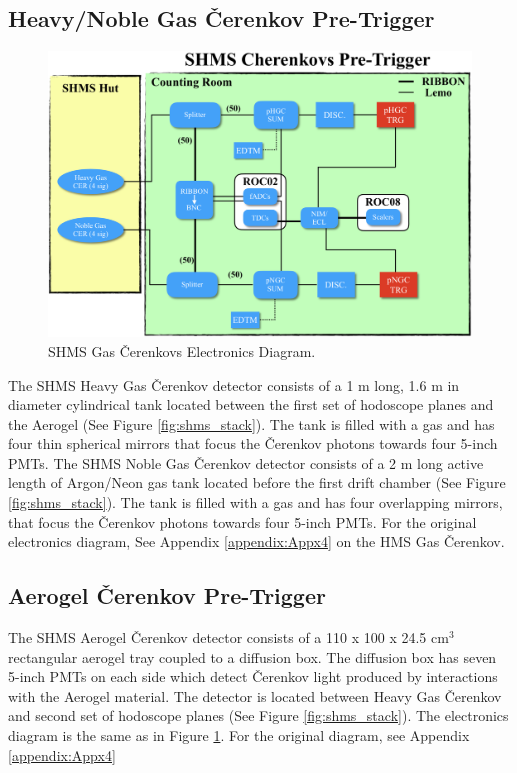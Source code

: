 \documentclass[11pt]{article}
\begin{document}
\subsection{Heavy/Noble Gas \v{C}erenkov Pre-Trigger}
\begin{figure}[h!]
  \centering
  \includegraphics[scale=0.5]{pCER_diagram.png}
  \caption{SHMS Gas \v{C}erenkovs Electronics Diagram.}
  \label{fig:pCER_diagram}
\end{figure}
\noindent The SHMS Heavy Gas \v{C}erenkov detector consists of a 1 m long, 1.6 m in diameter cylindrical tank located between the first set of hodoscope planes and the Aerogel (See Figure \ref{fig:shms_stack}).
The tank is filled with a gas and has four thin spherical mirrors that focus the \v{C}erenkov photons towards four 5-inch PMTs\cite{shms_hgc_talk}. 
\newline
\indent The SHMS Noble Gas \v{C}erenkov detector consists of a 2 m long active length of Argon/Neon gas tank located before the first drift chamber (See Figure \ref{fig:shms_stack}).
The tank is filled with a gas and has four overlapping mirrors, that focus the \v{C}erenkov photons towards four 5-inch PMTs\cite{shms_ngc_talk}. 
For the original electronics diagram, See Appendix \ref{appendix:Appx4} on the HMS Gas \v{C}erenkov.
\subsection{Aerogel \v{C}erenkov Pre-Trigger}
\indent The SHMS Aerogel \v{C}erenkov detector consists of a 110 x 100 x 24.5 cm$^{3}$ rectangular aerogel tray coupled to a diffusion box. The diffusion box has seven 5-inch PMTs on each side
which detect \v{C}erenkov light produced by interactions with the Aerogel material\cite{shms_aero_article}. The detector is located between Heavy Gas \v{C}erenkov and second set of hodoscope planes
(See Figure \ref{fig:shms_stack}). The electronics diagram is the same as in Figure \ref{fig:pCER_diagram}. For the original diagram, see Appendix \ref{appendix:Appx4}
\newpage
\end{document}

